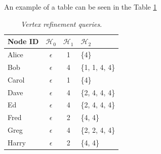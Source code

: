 An example of a table can be seen in the Table \ref{table:ejemplo_vertex_refi_query}

\begin{table}
	\centering{}
	\begin{tabular}{ l || c | c | l }
		\hline
		Node ID & $\mathcal{H}_{0}$ & $\mathcal{H}_{1}$ & $\mathcal{H}_{2}$ \\
		\hline
		\hline
		Alice & $\epsilon$ & 1 & \{4\}  \\
		\hline
		Bob & $\epsilon$ & 4 & \{1, 1, 4, 4\}  \\
		\hline
		Carol & $\epsilon$ & 1 & \{4\}  \\
		\hline
		Dave & $\epsilon$ & 4 & \{2, 4, 4, 4\}  \\
		\hline
		Ed & $\epsilon$ & 4 & \{2, 4, 4, 4\}  \\
		\hline
		Fred & $\epsilon$ & 2 & \{4, 4\}  \\
		\hline
		Greg & $\epsilon$ & 4 & \{2, 2, 4, 4\}  \\
		\hline
		Harry & $\epsilon$ & 2 & \{4, 4\}  \\
		\hline
	\end{tabular}
	\caption{\textit{Vertex refinement queries}.}
	\label{table:ejemplo_vertex_refi_query}
\end{table}